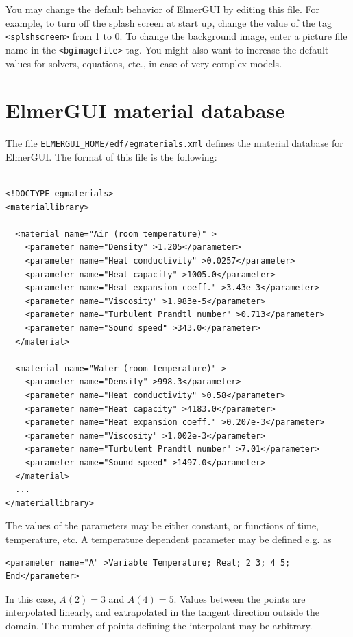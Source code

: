 You may change the default behavior of ElmerGUI by editing this file. For example, to turn off the splash screen at start up, change the value of the tag {\tt <splshscreen>} from 1 to 0. To change the background image, enter a picture file name in the {\tt <bgimagefile>} tag. You might also want to increase the default values for solvers, equations, etc., in case of very complex models.

\chapter{ElmerGUI material database}

The file {\tt ELMERGUI\_HOME/edf/egmaterials.xml} defines the material database for ElmerGUI. The
format of this file is the following:

\begin{footnotesize}
\begin{verbatim}
 
<!DOCTYPE egmaterials>
<materiallibrary>
  
  <material name="Air (room temperature)" >
    <parameter name="Density" >1.205</parameter>
    <parameter name="Heat conductivity" >0.0257</parameter>
    <parameter name="Heat capacity" >1005.0</parameter>
    <parameter name="Heat expansion coeff." >3.43e-3</parameter>
    <parameter name="Viscosity" >1.983e-5</parameter>
    <parameter name="Turbulent Prandtl number" >0.713</parameter>
    <parameter name="Sound speed" >343.0</parameter>
  </material>

  <material name="Water (room temperature)" >
    <parameter name="Density" >998.3</parameter>
    <parameter name="Heat conductivity" >0.58</parameter>
    <parameter name="Heat capacity" >4183.0</parameter>
    <parameter name="Heat expansion coeff." >0.207e-3</parameter>
    <parameter name="Viscosity" >1.002e-3</parameter>
    <parameter name="Turbulent Prandtl number" >7.01</parameter>
    <parameter name="Sound speed" >1497.0</parameter>
  </material>
  ...
</materiallibrary>

\end{verbatim}
\end{footnotesize}

The values of the parameters may be either constant, or functions of time, temperature, etc.
A temperature dependent parameter may be defined e.g. as

\begin{footnotesize}
\begin{verbatim}
<parameter name="A" >Variable Temperature; Real; 2 3; 4 5; End</parameter>
\end{verbatim}
\end{footnotesize}
In this case, $A(2)=3$ and $A(4)=5$. Values between the points are interpolated linearly,
and extrapolated in the tangent direction outside the domain. The number of points defining 
the interpolant may be arbitrary. 

